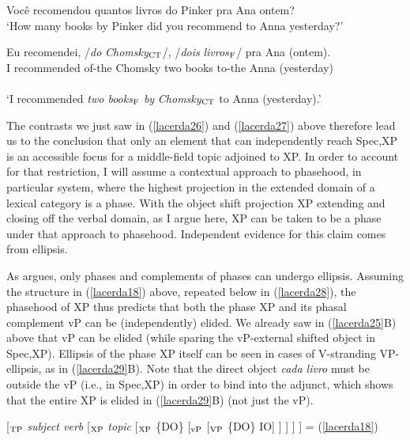 \documentclass[output=paper]{langscibook}
\begin{document}
\begin{exe}
\ex \label{lacerda27}
\begin{xlist}
 \label{lacerda27A}
Você recomendou quantos livros do Pinker pra Ana ontem?\\
‘How many books by Pinker did you recommend to Anna yesterday?’	

 \label{lacerda27B}
\gll {}Eu 	recomendei, 	/\emph{do}	 \emph{Chomsky}$_{\textnormal{CT}}$/,	/\emph{dois} 	\emph{livros}$_{\textnormal{F}}$/	pra 	Ana	(ontem).\\
I 	recommended	of-the 	Chomsky 	two	books 	to-the 	Anna	(yesterday)\\\\
‘I recommended \emph{two books}$_{\textnormal{F}}$ \emph{by} \emph{Chomsky}$_{\textnormal{CT}}$ to Anna (yesterday).’

\end{xlist}
\end{exe}

The contrasts we just saw in (\ref{lacerda26}) and (\ref{lacerda27}) above therefore lead us to the conclusion that only an element that can independently reach Spec,XP is an accessible focus for a middle-field topic adjoined to XP. In order to account for that restriction, I will assume a contextual approach to phasehood, in particular \citet{boskovic2014} system, where the highest projection in the extended domain of a lexical category is a phase. With the object shift projection XP extending and closing off the verbal domain, as I argue here, XP can be taken to be a phase under that approach to phasehood. Independent evidence for this claim comes from ellipsis.

As  \citeyear{boskovic2014} argues, only phases and complements of phases can undergo ellipsis. Assuming the structure in (\ref{lacerda18}) above, repeated below in (\ref{lacerda28}), the phasehood of XP thus predicts that both the phase XP and its phasal complement vP can be (independently) elided. We already saw in (\ref{lacerda25}B) above that vP can be elided (while sparing the vP-external shifted object in Spec,XP). Ellipsis of the phase XP itself can be seen in cases of V-stranding VP-ellipsis, as in (\ref{lacerda29}B). Note that the direct object \emph{cada livro} must be outside the vP (i.e., in Spec,XP) in order to bind into the adjunct, which shows that the entire XP is elided in (\ref{lacerda29}B) (not just the vP).

\begin{exe}
\ex \label{lacerda28}
[$_{\textnormal{TP}}$ \emph{subject verb} [$_{\textnormal{XP}}$ \emph{topic} [$_{\textnormal{XP}}$ \{DO\} [$_{\textnormal{vP}}$ [$_{\textnormal{VP}}$ \{DO\} IO] ] ] ] ] = (\ref{lacerda18})

\end{exe}
\end{document}
